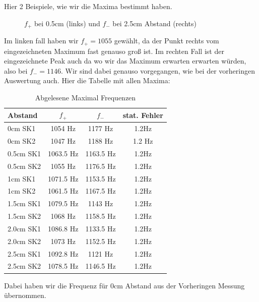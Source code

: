 \documentclass[twoside]{protokoll}
\begin{document}
 
Hier 2 Beispiele, wie wir die Maxima bestimmt haben.
\begin{figure}[H]
    \centering
    \caption{$f_+$ bei 0.5cm (links) und $f_-$ bei 2.5cm Abstand (rechts)}
\end{figure}
Im linken fall haben wir $f_+ = 1055$ gewählt, da der Punkt rechts vom eingezeichneten Maximum fast genauso groß ist.
Im rechten Fall ist der eingezeichnete Peak auch da wo wir das Maximum erwarten erwarten würden, also bei $f_- = 1146$.
Wir sind dabei genauso vorgegangen, wie bei der vorheringen Auswertung auch.
Hier die Tabelle mit allen Maxima:
\begin{table}[H]
        \centering
        \caption{Abgelesene Maximal Frequenzen}
        \begin{tabularx}{0.7\textwidth}{X c c c}
            \toprule
            \textbf{Abstand} & \textbf{$f_+$} & \textbf{$f_-$} & \textbf{stat. Fehler} \\
            \midrule

            0cm SK1 &  1054 Hz & 1177 Hz & 1.2Hz \\
            0cm SK2 &  1047 Hz & 1188 Hz & 1.2 Hz\\
            0.5cm SK1 &  1063.5 Hz & 1163.5 Hz & 1.2Hz \\
            0.5cm SK2 &  1055 Hz & 1176.5 Hz & 1.2Hz \\
            1cm SK1 &  1071.5 Hz & 1153.5 Hz & 1.2Hz \\
            1cm SK2 &  1061.5 Hz & 1167.5 Hz & 1.2Hz \\
            1.5cm SK1 &  1079.5 Hz & 1143 Hz & 1.2Hz \\
            1.5cm SK2 &  1068 Hz & 1158.5 Hz & 1.2Hz \\
            2.0cm SK1 &  1086.8 Hz & 1133.5 Hz & 1.2Hz \\
            2.0cm SK2 &  1073 Hz & 1152.5 Hz & 1.2Hz \\
            2.5cm SK1 &  1092.8 Hz & 1121 Hz & 1.2Hz \\
            2.5cm SK2 &  1078.5 Hz & 1146.5 Hz & 1.2Hz \\

            \bottomrule
        \end{tabularx}
        \label{tab:mytable}
    \end{table}
Dabei haben wir die Frequenz für 0cm Abstand aus der Vorheringen Messung übernommen.
\end{document}
